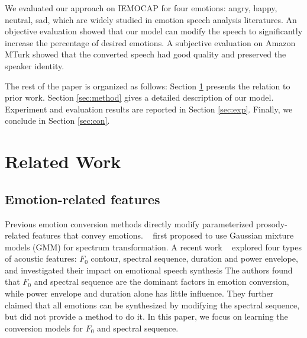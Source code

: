 \documentclass{article}
\begin{document}

We evaluated our approach on IEMOCAP \cite{busso2008iemocap} for four emotions: angry, happy, neutral, sad,  which are widely studied in emotion speech analysis literatures.
An objective evaluation showed that our model can modify the speech to significantly increase the percentage of desired emotions. A subjective evaluation on Amazon MTurk showed that the converted speech had good quality and preserved the speaker identity.

The rest of the paper is organized as follows: Section \ref{sec:related} presents the relation to prior work. Section \ref{sec:method} gives a detailed description of our model. Experiment and evaluation results are reported in Section \ref{sec:exp}. Finally, we conclude in Section \ref{sec:con}.


\section{Related Work}
\label{sec:related}

\subsection{Emotion-related features}
Previous emotion conversion methods directly modify parameterized prosody-related features that convey emotions. ~\cite{kawanami2003gmm} first proposed to use Gaussian mixture models (GMM) for spectrum transformation.
A recent work ~\cite{xue2018voice} explored four types of acoustic features: $F_0$ contour, spectral sequence, duration and power envelope, and investigated their impact on emotional speech synthesis
The authors found that $F_0$ and spectral sequence are the dominant factors in emotion conversion, while power envelope and duration alone has little influence. They further claimed that all emotions can be synthesized by modifying the spectral sequence, but did not provide a method to do it. In this paper, we focus on learning the conversion models for $F_0$ and spectral sequence.
\end{document}
